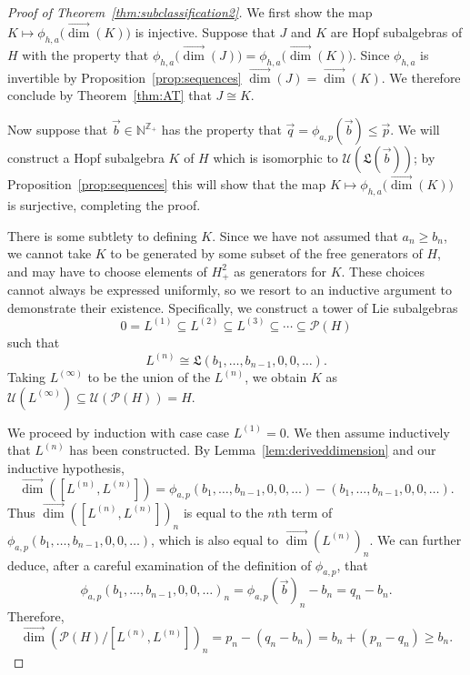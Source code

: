 \documentclass[11pt]{amsart}
\theoremstyle{definition}
\numberwithin{equation}{section}
\def\NN{{\mathbb N}}
\def\ZZ{{\mathbb Z}}
\newcommand{\vecdim}{\overrightarrow{\dim}}
\begin{document}
\begin{proof}[Proof of Theorem~\ref{thm:subclassification2}]
We first show the map $K \mapsto \phi_{h, a} \big( \vecdim(K)\big)$ is injective.  Suppose that $J$ and $K$ are Hopf subalgebras of $H$ with the property that $\phi_{h, a} \big(\vecdim(J)) = \phi_{h, a} \big(\vecdim(K))$.  
Since $\phi_{h, a}$ is invertible by Proposition~\ref{prop:sequences} $\vecdim(J) = \vecdim(K)$.  We therefore conclude by Theorem~\ref{thm:AT} that $J \cong K$.

Now suppose that $\vec{b} \in \NN^{\ZZ_{+}}$ has the property that $\vec{q} = \phi_{a, p}(\vec{b}) \le \vec{p}$.  
We will construct a Hopf subalgebra $K$ of $H$ which is isomorphic to $\mathcal{U}(\mathfrak{L}(\vec{b}))$; by Proposition~\ref{prop:sequences} this will show that the  map $K \mapsto \phi_{h, a} \big( \vecdim(K)\big)$ is surjective, completing the proof.

There is some subtlety to defining $K$.  Since we have not assumed that $a_{n} \ge b_{n}$, we cannot take $K$ to be generated by some subset of the free generators of $H$, and may have to choose elements of $H^{2}_{+}$ as generators for $K$.  
These choices cannot always be expressed uniformly, so we resort to an inductive argument to demonstrate their existence.  
Specifically, we construct a tower of Lie subalgebras 
\[
0 = L^{(1)} \subseteq L^{(2)} \subseteq L^{(3)} \subseteq \cdots \subseteq \mathcal{P}(H)
\]
such that 
\[
L^{(n)} \cong \mathfrak{L}(b_{1}, \ldots, b_{n-1}, 0, 0, \ldots).
\]
Taking $L^{(\infty)}$ to be the union of the $L^{(n)}$, we obtain $K$ as $\mathcal{U}(L^{(\infty)}) \subseteq \mathcal{U}(\mathcal{P}(H)) = H$.

We proceed by induction with case case $L^{(1)} = 0$.  
We then assume inductively that $L^{(n)}$ has been constructed.  
By Lemma~\ref{lem:deriveddimension} and our inductive hypothesis,
\[
\vecdim([L^{(n)}, L^{(n)}])
 = 
\phi_{a, p}(b_{1}, \ldots, b_{n-1}, 0, 0, \ldots) - (b_{1}, \ldots, b_{n-1}, 0, 0, \ldots).
\]
Thus $\vecdim([L^{(n)}, L^{(n)}])_{n}$ is equal to the $n$th term of $\phi_{a, p}(b_{1}, \ldots, b_{n-1}, 0, 0, \ldots)$, which is also equal to $\vecdim(L^{(n)})_{n}$.  
We can further deduce, after a careful examination of the definition of $\phi_{a, p}$, that
\begin{equation}
\label{eq:inductivedimensionequality}
\phi_{a, p}(b_{1}, \ldots, b_{n-1}, 0, 0, \ldots)_{n}
=
\phi_{a, p}(\vec{b})_{n} - b_{n}
=
q_{n} - b_{n}.
\end{equation}
Therefore,
\[
\vecdim\left( \mathcal{P}(H) \big/ [L^{(n)}, L^{(n)}] \right)_{n}
= p_{n} - (q_{n} - b_{n})
= b_{n} + (p_{n} - q_{n})
\ge b_{n}.
\]


\end{proof}
\end{document}
